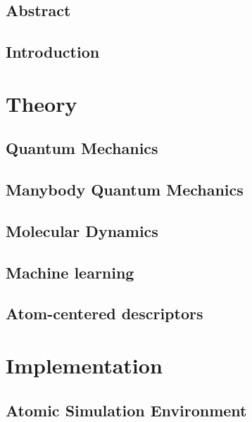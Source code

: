 \documentclass[12pt]{report}
\begin{document}


\chapter*{Abstract}


\tableofcontents

\chapter{Introduction}


\part{Theory}

\chapter{Quantum Mechanics}


\chapter{Manybody Quantum Mechanics}


\chapter{Molecular Dynamics}


\chapter{Machine learning}


\chapter{Atom-centered descriptors}


\part{Implementation}
\chapter{Atomic Simulation Environment}

\end{document}
